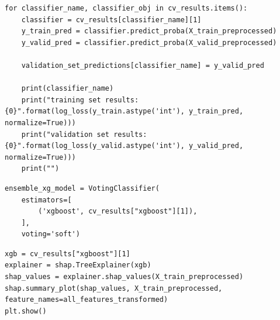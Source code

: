 \documentclass[12pt,a4paper]{report}
\theoremstyle{definition}
\begin{document}
\begin{lstlisting}[label=code:LogLossXG,  caption={Compare log loss of training and validation sets for XGBoost classifier}]
for classifier_name, classifier_obj in cv_results.items():
    classifier = cv_results[classifier_name][1]
    y_train_pred = classifier.predict_proba(X_train_preprocessed)
    y_valid_pred = classifier.predict_proba(X_valid_preprocessed)

    validation_set_predictions[classifier_name] = y_valid_pred

    print(classifier_name)
    print("training set results: {0}".format(log_loss(y_train.astype('int'), y_train_pred, normalize=True)))
    print("validation set results: {0}".format(log_loss(y_valid.astype('int'), y_valid_pred, normalize=True)))
    print("")
\end{lstlisting}

\begin{lstlisting}[label=code:VotingXG,  caption={Soft voting classifier for XGBoost}]
ensemble_xg_model = VotingClassifier(
    estimators=[
        ('xgboost', cv_results["xgboost"][1]),
    ],
    voting='soft')
\end{lstlisting}

\begin{lstlisting}[label=code:SHAPXG,  caption={SHAP explainer for XGBoost}]
xgb = cv_results["xgboost"][1]
explainer = shap.TreeExplainer(xgb)
shap_values = explainer.shap_values(X_train_preprocessed)
shap.summary_plot(shap_values, X_train_preprocessed, feature_names=all_features_transformed)
plt.show()
\end{lstlisting}

\end{document}
